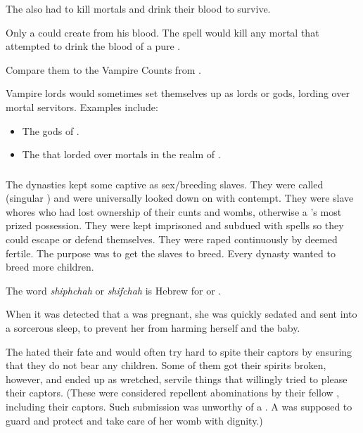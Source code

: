 The \reavers also had to kill mortals and drink their blood to survive. 

Only a \bezed could create \reavers from his blood. 
The spell would kill any mortal that attempted to drink the blood of a pure \resphan.

Compare them to the Vampire Counts from \cite{RPG:Warhammer}. 

Vampire lords would sometimes set themselves up as lords or gods, lording over mortal servitors. 
Examples include:

\begin{itemize}
  \item 
    The gods of . 
  \item 
    The  that lorded over mortals in the realm of . 
\end{itemize}







\subsubsection[Yurideth]{\Yurideth}
\index{\yurid}
The \resphan{} dynasties kept some captive \resviel{} as sex/breeding slaves. 
They were called \yurideth{} (singular \yurid{}) and were universally looked down on with contempt. 
They were slave whores who had lost ownership of their cunts and wombs, otherwise a \resvil{}'s most prized possession.
They were kept imprisoned and subdued with spells so they could escape or defend themselves. 
They were raped continuously by \resphain{} deemed fertile. The purpose was to get the slaves to breed. 
Every dynasty wanted to breed more children. 

The word \emph{shiphchah} or \emph{shifchah} is Hebrew for  or . 

When it was detected that a \yurid{} was pregnant, she was quickly sedated and sent into a sorcerous sleep, to prevent her from harming herself and the baby. 

The \yurideth{} hated their fate and would often try hard to spite their captors by ensuring that they do not bear any children. Some of them got their spirits broken, however, and ended up as wretched, servile things that willingly tried to please their captors. 
(These were considered repellent abominations by their fellow \resphain{}, including their captors. Such submission was unworthy of a \resvil{}. A \resvil{} was supposed to guard and protect and take care of her womb with dignity.)

